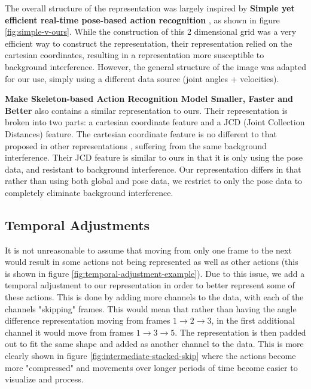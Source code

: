 The overall structure of the representation was largely inspired by \textbf{Simple yet efficient real-time pose-based action recognition} \cite{simple_yet_efficient}, as shown in figure \ref{fig:simple-v-ours}. While the construction of this 2 dimensional grid was a very efficient way to construct the representation, their representation relied on the cartesian coordinates, resulting in a representation more susceptible to background interference. However, the general structure of the image was adapted for our use, simply using a different data source (joint angles + velocities).

\iffalse
\begin{figure}[ht]
	\subfigure[]{\texttt{[image: smallerfasterbetterv2]}}
	\subfigure[]{\texttt{[image: IntermediateStacked]}}
	\centering
	\caption{Similar representations of our novel representation (b) compared to that of \textbf{Make Skeleton-based Action Recognition Model Smaller, Faster and Better} \cite{smaller_faster_better} (a).}
	\label{fig:smaller-v-ours}
\end{figure}
\fi

\textbf{Make Skeleton-based Action Recognition Model Smaller, Faster and Better} \cite{smaller_faster_better} also contains a similar representation to ours. Their representation is broken into two parts: a cartesian coordinate feature and a JCD (Joint Collection Distances) feature. The cartesian coordinate feature is no different to that proposed in other representations \cite{simple_yet_efficient}, suffering from the same background interference. Their JCD feature is similar to ours in that it is only using the pose data, and resistant to background interference. Our representation differs in that rather than using both global and pose data, we restrict to only the pose data to completely eliminate background interference.

\subsection{Temporal Adjustments}

It is not unreasonable to assume that moving from only one frame to the next would result in some actions not being represented as well as other actions (this is shown in figure \ref{fig:temporal-adjustment-example}). Due to this issue, we add a temporal adjustment to our representation in order to better represent some of these actions. This is done by adding more channels to the data, with each of the channels "skipping" frames. This would mean that rather than having the angle difference representation moving from frames $1 \rightarrow 2 \rightarrow 3$, in the first additional channel it would move from frames $1 \rightarrow 3 \rightarrow 5$. The representation is then padded out to fit the same shape and added as another channel to the data. This is more clearly shown in figure \ref{fig:intermediate-stacked-skip} where the actions become more "compressed" and movements over longer periods of time become easier to visualize and process.

